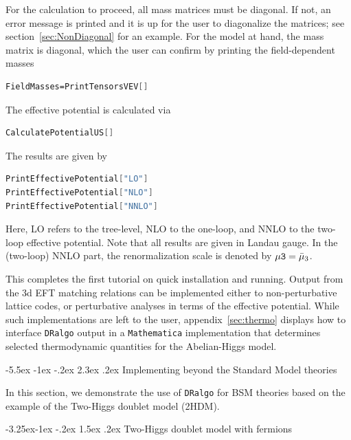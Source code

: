 \documentclass[11pt]{article}
\makeatletter
\def\dralgo{{\tt DRalgo}}
\newcommand{\Lamd}{\bmu_{3}}
\newcommand{\bmu}{\bar\mu}
\renewcommand\section{\@startsection{section}{1}{\z@}%
  {-5.5ex \@plus -1ex \@minus -.2ex}%
  {2.3ex \@plus.2ex}%
  {\normalfont\large\bfseries}}
\renewcommand\subsection{\@startsection{subsection}{2}{\z@}%
  {-3.25ex\@plus -1ex \@minus -.2ex}%
  {1.5ex \@plus .2ex}%
  {\normalfont\normalsize\bfseries}}
\makeatother
\begin{document}
For the calculation to proceed,
all mass matrices must be diagonal.
If not, an error message is printed and it is up for the user
to diagonalize the matrices;
see section~\ref{sec:NonDiagonal} for an example.
For the model at hand,
the mass matrix is diagonal,
which the user can confirm by printing the field-dependent masses
\begin{lstlisting}[language=Mathematica,mathescape=true]
FieldMasses=PrintTensorsVEV[]
\end{lstlisting}
%
The effective potential is calculated via
\begin{lstlisting}[language=Mathematica,mathescape=true]
CalculatePotentialUS[]
\end{lstlisting}
%
The results are given by
\begin{lstlisting}[language=Mathematica,mathescape=true]
PrintEffectivePotential["LO"]
PrintEffectivePotential["NLO"]
PrintEffectivePotential["NNLO"]
\end{lstlisting}
Here,
LO refers to the tree-level,
NLO to the one-loop, and
NNLO to the two-loop effective potential.
Note that all results are given in Landau gauge.
In the (two-loop) NNLO part, the renormalization scale is denoted by
${\tt \mu3}=\Lamd$.

This completes the first tutorial on quick installation and running.
Output from the 3d EFT matching relations can be implemented either to
non-perturbative lattice codes, or
perturbative analyses in terms of the effective potential.
While such implementations are left to the user,
appendix~\ref{sec:thermo} displays how to interface \dralgo{} output in
a {\tt Mathematica} implementation that determines
selected thermodynamic quantities for the Abelian-Higgs model.

%
\section{Implementing beyond the Standard Model theories}
\label{sec:BSM}

In this section,
we demonstrate the use of \dralgo{} for BSM theories based on
the example of the Two-Higgs doublet model (2HDM).

\subsection{Two-Higgs doublet model with fermions}
\label{sec:2HDM}
\end{document}
